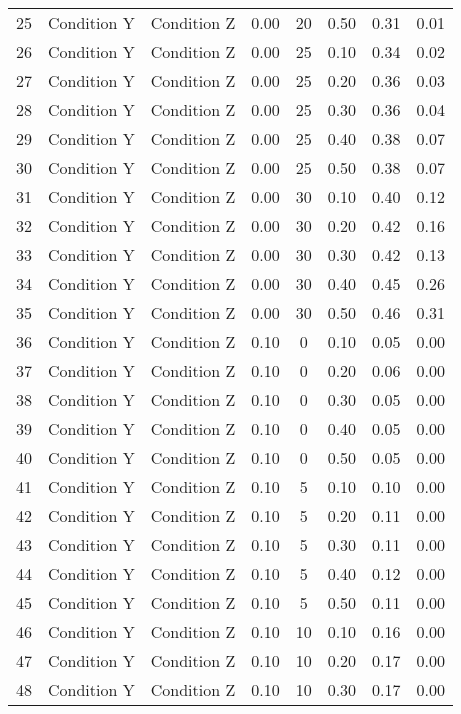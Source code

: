 \begin{landscape}
\begin{longtable}{cc cc cc cc}
  25 & Condition Y & Condition Z & 0.00 &  20 & 0.50 & 0.31 & 0.01 \\ 
  26 & Condition Y & Condition Z & 0.00 &  25 & 0.10 & 0.34 & 0.02 \\ 
  27 & Condition Y & Condition Z & 0.00 &  25 & 0.20 & 0.36 & 0.03 \\ 
  28 & Condition Y & Condition Z & 0.00 &  25 & 0.30 & 0.36 & 0.04 \\ 
  29 & Condition Y & Condition Z & 0.00 &  25 & 0.40 & 0.38 & 0.07 \\ 
  30 & Condition Y & Condition Z & 0.00 &  25 & 0.50 & 0.38 & 0.07 \\ 
  31 & Condition Y & Condition Z & 0.00 &  30 & 0.10 & 0.40 & 0.12 \\ 
  32 & Condition Y & Condition Z & 0.00 &  30 & 0.20 & 0.42 & 0.16 \\ 
  33 & Condition Y & Condition Z & 0.00 &  30 & 0.30 & 0.42 & 0.13 \\ 
  34 & Condition Y & Condition Z & 0.00 &  30 & 0.40 & 0.45 & 0.26 \\ 
  35 & Condition Y & Condition Z & 0.00 &  30 & 0.50 & 0.46 & 0.31 \\ 
  36 & Condition Y & Condition Z & 0.10 &   0 & 0.10 & 0.05 & 0.00 \\ 
  37 & Condition Y & Condition Z & 0.10 &   0 & 0.20 & 0.06 & 0.00 \\ 
  38 & Condition Y & Condition Z & 0.10 &   0 & 0.30 & 0.05 & 0.00 \\ 
  39 & Condition Y & Condition Z & 0.10 &   0 & 0.40 & 0.05 & 0.00 \\ 
  40 & Condition Y & Condition Z & 0.10 &   0 & 0.50 & 0.05 & 0.00 \\ 
  41 & Condition Y & Condition Z & 0.10 &   5 & 0.10 & 0.10 & 0.00 \\ 
  42 & Condition Y & Condition Z & 0.10 &   5 & 0.20 & 0.11 & 0.00 \\ 
  43 & Condition Y & Condition Z & 0.10 &   5 & 0.30 & 0.11 & 0.00 \\ 
  44 & Condition Y & Condition Z & 0.10 &   5 & 0.40 & 0.12 & 0.00 \\ 
  45 & Condition Y & Condition Z & 0.10 &   5 & 0.50 & 0.11 & 0.00 \\ 
  46 & Condition Y & Condition Z & 0.10 &  10 & 0.10 & 0.16 & 0.00 \\ 
  47 & Condition Y & Condition Z & 0.10 &  10 & 0.20 & 0.17 & 0.00 \\ 
  48 & Condition Y & Condition Z & 0.10 &  10 & 0.30 & 0.17 & 0.00 \\ 

\end{longtable}
\end{landscape}
